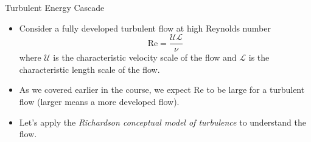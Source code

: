 \begin{frame}{Turbulent Energy Cascade}
\begin{itemize}
	\item Consider a fully developed turbulent flow at high Reynolds number
	$$\mathrm{Re} = \frac{\mathcal{U}\mathcal{L}}{\nu}$$
	where $\mathcal{U}$ is the characteristic velocity scale of the flow and $\mathcal{L}$ is the characteristic length scale of the flow.
	\item As we covered earlier in the course, we expect Re to be large for a turbulent flow (larger means a more developed flow).
	\item Let's apply the \textit{Richardson conceptual model of turbulence} to understand the flow.
\end{itemize}
\end{frame}



